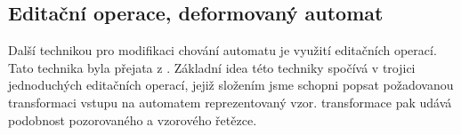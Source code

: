 \documentclass[a4paper,10pt]{article}
\begin{document}
% 
% 
% 
% 
% 
%  
% 

\subsection{Editační operace, deformovaný automat} \label{sec:DefAut}
Další technikou pro modifikaci chování automatu je využití editačních operací. Tato technika byla přejata z \cite{AstGonMenGar-FuzzAutEpsMovCmpFuzzMeasBtwStrs}. Základní idea této techniky spočívá v trojici jednoduchých editačních operací, jejiž složením jsme schopni popsat požadovanou transformaci vstupu na automatem reprezentovaný vzor.  transformace pak udává podobnost pozorovaného a vzorového řetězce.
\end{document}
